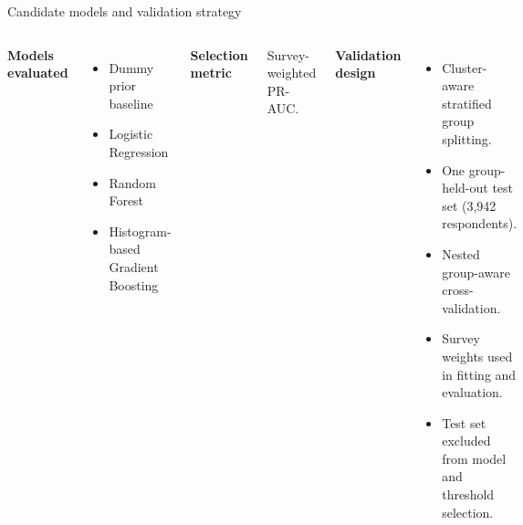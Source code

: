 \documentclass[aspectratio=169,10pt]{beamer}
\begin{document}

\begin{frame}{Candidate models and validation strategy}

\begin{columns}[T,onlytextwidth]


\textbf{Models evaluated}

\begin{itemize}

    \item Dummy prior baseline

    \item Logistic Regression

    \item Random Forest

    \item Histogram-based Gradient Boosting

\end{itemize}

\vspace{.2cm}

\textbf{Selection metric}

Survey-weighted PR-AUC.


\textbf{Validation design}

\begin{itemize}

    \item Cluster-aware stratified group splitting.

    \item One group-held-out test set (3,942 respondents).

    \item Nested group-aware cross-validation.

    \item Survey weights used in fitting and evaluation.

    \item Test set excluded from model and threshold selection.

\end{itemize}

\end{columns}

\end{frame}
\end{document}
